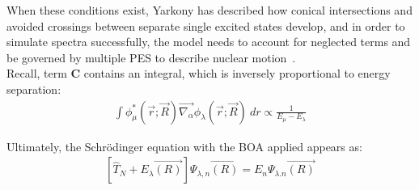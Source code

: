 When these conditions exist, Yarkony has described how conical intersections and avoided crossings between separate single excited states develop, and in order to simulate spectra successfully, the model needs to account for neglected terms and be governed by multiple PES to describe nuclear motion~\cite{yarkony2001conical}. %
\\ 
Recall, term \textbf{C} contains an integral, which is inversely proportional to energy separation:
\begin{equation}\label{eq:inverseproportional}
    \begin{split}
            \int \phi_{\mu}^{*} (\Vec{r};\Vec{R}) \Vec{\nabla_{\alpha}} \phi_{\lambda} (\Vec{r};\Vec{R})~dr 
            \propto \frac{1}{E_{\mu} - E_{\lambda}}
    \end{split}
\end{equation}

Ultimately, the Schrödinger equation with the BOA applied appears as:
\begin{equation}\label{eq:10a}
    \begin{split} 
            \left[ \hat{T}_N + E_{\lambda} \Vec{(R)} \right] \Psi_{\lambda, n} \Vec{(R)} = E_{n} \Psi_{\lambda. n} \Vec{(R)}
    \end{split}
\end{equation}

